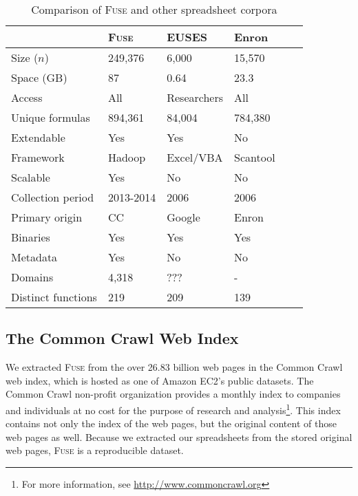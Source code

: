 \documentclass[conference]{IEEEtran}
\begin{document}
\begin{table}[!t]
\caption{Comparison of \textsc{Fuse} and other spreadsheet corpora\label{tab:corpora}}
\centering
\begin{tabular}{llllll}
\toprule
 & \textbf{\textsc{Fuse}} & \textbf{EUSES} & \textbf{Enron} \\
\midrule
Size ($n$) & 249,376 & 6,000 & 15,570\\
Space (GB) & 87  & 0.64 & 23.3\\
Access & All & Researchers & All \\
Unique formulas & 894,361 & 84,004 & 784,380 \\
Extendable & Yes & Yes & No\\
Framework & Hadoop & Excel/VBA & Scantool \\
Scalable & Yes & No & No\\
Collection period & 2013-2014 & 2006 & 2006 \\
Primary origin & CC & Google & Enron \\
Binaries & Yes  & Yes & Yes \\
Metadata & Yes & No & No \\
Domains & 4,318 & ??? & - \\
Distinct functions & 219 & 209 & 139 \\
\bottomrule
\end{tabular}
\end{table}

\subsection{The Common Crawl Web Index}

We extracted \textsc{Fuse} from the over 26.83 billion web pages in the Common Crawl web index, which is hosted as one of Amazon EC2's public datasets. 
The Common Crawl non-profit organization provides a monthly index to companies and individuals at no cost for the purpose of research and analysis\footnote{For more information, see \url{http://www.commoncrawl.org}}.
This index contains not only the index of the web pages, but the original content of those web pages as well.
Because we extracted our spreadsheets from the stored original web pages, \textsc{Fuse} is a reproducible dataset.
\end{document}
